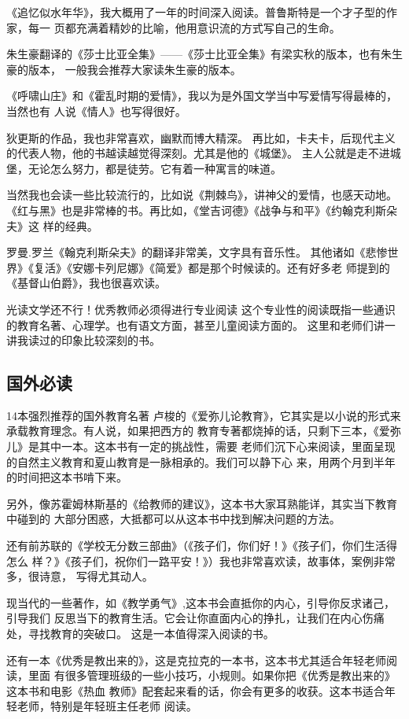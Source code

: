 \documentclass[11pt]{ctexart}
\begin{document}
{{{{《追忆似水年华》，我大概用了一年的时间深入阅读。普鲁斯特是一个才子型的作家，每一
页都充满着精妙的比喻，他用意识流的方式写自己的生命。

朱生豪翻译的《莎士比亚全集》——《莎士比亚全集》有梁实秋的版本，也有朱生豪的版本，
一般我会推荐大家读朱生豪的版本。

《呼啸山庄》和《霍乱时期的爱情》，我以为是外国文学当中写爱情写得最棒的，当然也有
人说《情人》也写得很好。

狄更斯的作品，我也非常喜欢，幽默而博大精深。
再比如，卡夫卡，后现代主义的代表人物，他的书越读越觉得深刻。尤其是他的《城堡》。
主人公就是走不进城堡，无论怎么努力，都是徒劳。它有着一种寓言的味道。

当然我也会读一些比较流行的，比如说《荆棘鸟》，讲神父的爱情，也感天动地。
《红与黑》也是非常棒的书。再比如，《堂吉诃德》《战争与和平》《约翰克利斯朵夫》这
样的经典。

罗曼.罗兰《翰克利斯朵夫》的翻译非常美，文字具有音乐性。
其他诸如《悲惨世界》《复活》《安娜卡列尼娜》《简爱》都是那个时候读的。还有好多老
师提到的《基督山伯爵》，我也很喜欢读。

光读文学还不行！优秀教师必须得进行专业阅读
这个专业性的阅读既指一些通识的教育名著、心理学。也有语文方面，甚至儿童阅读方面的。
这里和老师们讲一讲我读过的印象比较深刻的书。

\subsection{国外必读}
\label{sec:orga34c258}
14本强烈推荐的国外教育名著
卢梭的《爱弥儿论教育》，它其实是以小说的形式来承载教育理念。有人说，如果把西方的
教育专著都烧掉的话，只剩下三本，《爱弥儿》是其中一本。这本书有一定的挑战性，需要
老师们沉下心来阅读，里面呈现的自然主义教育和夏山教育是一脉相承的。我们可以静下心
来，用两个月到半年的时间把这本书啃下来。

另外，像苏霍姆林斯基的《给教师的建议》，这本书大家耳熟能详，其实当下教育中碰到的
大部分困惑，大抵都可以从这本书中找到解决问题的方法。

还有前苏联的《学校无分数三部曲》（《孩子们，你们好！》《孩子们，你们生活得怎么
样？》《孩子们，祝你们一路平安！》）我也非常喜欢读，故事体，案例非常多，很诗意，
写得尤其动人。

现当代的一些著作，如《教学勇气》,这本书会直抵你的内心，引导你反求诸己，引导我们
反思当下的教育生活。它会让你直面内心的挣扎，让我们在内心伤痛处，寻找教育的突破口。
这是一本值得深入阅读的书。

还有一本《优秀是教出来的》，这是克拉克的一本书，这本书尤其适合年轻老师阅读，里面
有很多管理班级的一些小技巧，小规则。如果你把《优秀是教出来的》这本书和电影《热血
教师》配套起来看的话，你会有更多的收获。这本书适合年轻老师，特别是年轻班主任老师
阅读。

}}}}
\end{document}

